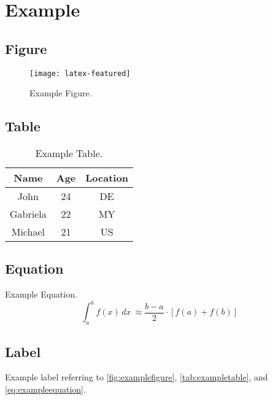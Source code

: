 \chapter{Example}

\section{Figure}

\begin{figure}
  \centering
  \texttt{[image: latex-featured]}
  \caption{Example Figure.}
  \label{fig:examplefigure}
\end{figure}

\section{Table}

\begin{table}
	\centering
	\caption{Example Table.}
	\label{tab:exampletable}
	\begin{tabular}{ccc}
		\toprule
		Name & Age & Location \\ \midrule
    John & 24 & DE \\
    Gabriela & 22 & MY \\
    Michael & 21 & US \\ \bottomrule
	\end{tabular}
\end{table}

\section{Equation}

Example Equation.
\begin{equation}
	\int_{a}^{b} f(x) \, dx\ \approx \frac{b - a}{2} \cdot [f(a) + f(b)]
	\label{eq:exampleequation}
\end{equation}

\section{Label}

Example label referring to \autoref{fig:examplefigure}, \autoref{tab:exampletable}, and \autoref{eq:exampleequation}.

